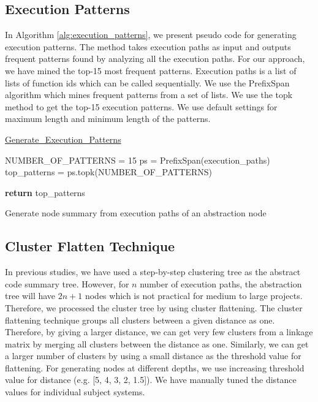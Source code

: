 \subsection{Execution Patterns}
In Algorithm \ref{alg:execution_patterns}, we present pseudo code for generating execution patterns. The method takes execution paths as input and outputs frequent patterns found by analyzing all the execution paths. For our approach, we have mined the top-15 most frequent patterns. Execution paths is a list of lists of function ids which can be called sequentially. We use the PrefixSpan algorithm which mines frequent patterns from a set of lists. We use the topk method to get the top-15 execution patterns. We use default settings for maximum length and minimum length of the patterns. 

\begin{algorithm}
    
    \underline{Generate\_Execution\_Patterns} 
    
    NUMBER\_OF\_PATTERNS = 15\;
    ps = PrefixSpan(execution\_paths)\;
    top\_patterns = ps.topk(NUMBER\_OF\_PATTERNS)\; 
    
    \textbf{return} top\_patterns\;
    \caption{Generate node summary from execution paths of an abstraction node}
    \label{alg:execution_patterns}
\end{algorithm}


\subsection{Cluster Flatten Technique}

In previous studies, we have used a step-by-step clustering tree as the abstract code summary tree. However, for $n$ number of execution paths, the abstraction tree will have $2n + 1$ nodes which is not practical for medium to large projects. Therefore, we processed the cluster tree by using cluster flattening. The cluster flattening technique groups all clusters between a given distance as one. Therefore, by giving a larger distance, we can get very few clusters from a linkage matrix by merging all clusters between the distance as one. Similarly, we can get a larger number of clusters by using a small distance as the threshold value for flattening. For generating nodes at different depths, we use increasing threshold value for distance (e.g. [5, 4, 3, 2, 1.5]). We have manually tuned the distance values for individual subject systems.



